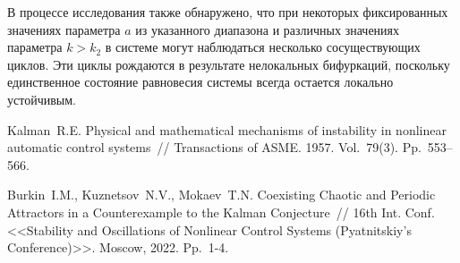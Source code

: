 В процессе исследования также обнаружено, что при некоторых фиксированных значениях параметра $a$  из указанного диапазона и различных значениях параметра    $k>k_2$ в системе могут наблюдаться несколько сосуществующих циклов. Эти циклы рождаются в результате нелокальных бифуркаций, поскольку единственное состояние равновесия системы всегда остается локально устойчивым.

  


%



\begin{thebibliography}{9} %
 Kalman~R.E. Physical and mathematical mechanisms of instability in nonlinear automatic control systems~// Transactions of ASME. 1957. Vol.~79(3). Pp.~553–566.

 Burkin~I.M., Kuznetsov~N.V., Mokaev~T.N. Coexisting Chaotic and Periodic Attractors in a Counterexample to the Kalman Conjecture~// 16th Int. Conf. <<Stability and Oscillations of Nonlinear Control Systems (Pyatnitskiy's Conference)>>. Moscow, 2022. Pp.~1-4.




\end{thebibliography}




%

